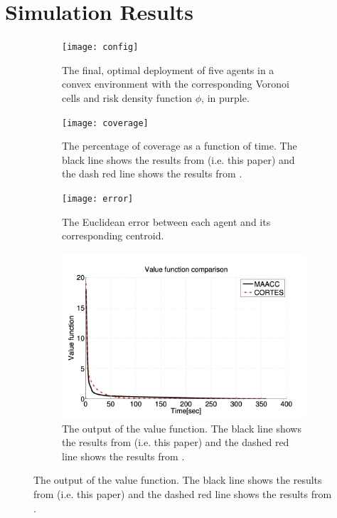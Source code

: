 \documentclass[11pt]{article}
\begin{document}
\section{Simulation Results}
\begin{figure}[H]
	\begin{subfigure}{.5\textwidth}
		\centering 
		\texttt{[image: config]}
		\caption{The final, optimal deployment of five agents in a convex environment with the corresponding Voronoi cells and risk density function $\phi$, in purple.}
	\end{subfigure}
	\begin{subfigure}{.5\textwidth}
		\centering 
		\texttt{[image: coverage]}
		\caption{The percentage of coverage as a function of time. The black line shows the results from \cite{FLAIRS1612802} (i.e. this paper) and the dash red line shows the results from \cite{Cortes:2004}.}
	\end{subfigure}
	\begin{subfigure}{.5\textwidth}
		\centering 
		\texttt{[image: error]}
		\caption{The Euclidean error between each agent and its corresponding centroid.}
	\end{subfigure}
	\begin{subfigure}{.5\textwidth}
		\centering 
		\includegraphics[scale=0.37]{value}
		\caption{The output of the value function. The black line shows the results from \cite{FLAIRS1612802} (i.e. this paper) and the dashed red line shows the results from \cite{Cortes:2004}.}
	\end{subfigure}
\end{figure}


\end{document}
